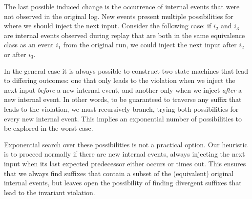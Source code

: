  The last possible induced change is the occurrence of
internal events that were not observed in the original log.
New events present multiple possibilities for where
we should inject the next input. Consider the following case:
if $i_2$ and $i_3$ are internal events observed
during replay that are both in the same equivalence class as an event $i_1$ from the
original run, we could inject the next input after $i_2$ or after $i_3$.


In the general case it is always possible to construct two state machines that lead
to differing outcomes: one that only leads to the violation when
we inject the next input
\emph{before} a new internal event, and another only when we inject \emph{after} a new internal
event. In other words, to be guaranteed to traverse any suffix that leads
to the violation, we must recursively branch, trying both
possibilities for every new internal event. This implies an exponential number of
possibilities to be explored in the worst case.

Exponential search over these possibilities is not a practical option. Our heuristic
is to proceed normally if there are new internal events,
always injecting the next input when its last expected predecessor
either occurs or times out. This ensures that we always find suffixes that
contain a subset of the (equivalent) original internal events, but leaves open the
possibility of finding divergent suffixes that lead to the invariant
violation.


